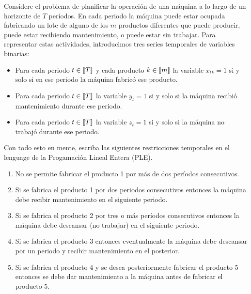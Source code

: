 \documentclass[ a4paper, twoside, 11pt]{article}
\begin{document}
\vspace{\baselineskip}

\begin{problem}
Considere el problema de planificar la operaci\'on de una m\'aquina a lo largo de un horizonte de $T$ per\'iodos. En cada periodo la m\'aquina puede estar ocupada fabricando un lote de alguno de los $m$ productos diferentes que puede producir, puede estar recibiendo mantenimiento, o puede estar sin trabajar. Para representar estas actividades, introducimos tres series temporales de variables binarias: 
\begin{itemize}
\item Para cada periodo $t \in \llbracket T \rrbracket$ y cada producto $k \in \llbracket m \rrbracket$ la variable $x_{tk} = 1$ si y solo si en ese periodo la m\'aquina fabric\'o ese producto. 
\item Para cada periodo $t \in \llbracket T \rrbracket$ la variable $y_t = 1$ si y solo si la m\'aquina recibi\'o mantenimiento durante ese periodo. 
\item Para cada periodo $t \in \llbracket T \rrbracket$ la variable $z_t = 1$ si y solo si la m\'aquina no trabaj\'o durante ese periodo. 
\end{itemize}

Con todo esto en mente, escriba las siguientes restricciones temporales en el lenguage de la Progamaci\'on Lineal Entera (PLE). 
\begin{enumerate}[label=\textbf{\alph*)}]
\item No se permite fabricar el producto 1 por m\'as de dos per\'iodos consecutivos. 
\item Si se fabrica el producto 1 por dos periodos consecutivos entonces la m\'aquina debe recibir mantenimiento en el siguiente periodo. 
\item Si se fabrica el producto 2 por tres o m\'as per\'iodos consecutivos entonces la m\'aquina debe descansar (\ie no trabajar) en el siguiente periodo. 
\item Si se fabrica el producto 3 entonces eventualmente la m\'aquina debe descansar por un periodo y recibir mantenimiento en el posterior. 
\item Si se fabrica el producto 4 y se desea posteriormente fabricar el producto 5 entonces se debe dar mantenimiento a la m\'aquina antes de fabricar el producto 5. 
\end{enumerate}
\QED


\end{problem}
\end{document}
